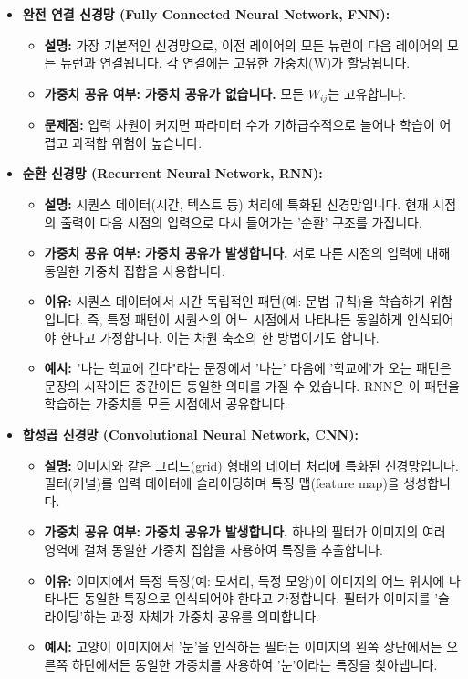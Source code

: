 \documentclass[11pt,a4paper]{article}
\begin{document}
\begin{itemize}
    \item \textbf{완전 연결 신경망 (Fully Connected Neural Network, FNN):}
    \begin{itemize}
        \item \textbf{설명:} 가장 기본적인 신경망으로, 이전 레이어의 모든 뉴런이 다음 레이어의 모든 뉴런과 연결됩니다. 각 연결에는 고유한 가중치(W)가 할당됩니다.
        \item \textbf{가중치 공유 여부:} \textbf{가중치 공유가 없습니다.} 모든 $W_{ij}$는 고유합니다.
        \item \textbf{문제점:} 입력 차원이 커지면 파라미터 수가 기하급수적으로 늘어나 학습이 어렵고 과적합 위험이 높습니다.
    \end{itemize}

    \item \textbf{순환 신경망 (Recurrent Neural Network, RNN):}
    \begin{itemize}
        \item \textbf{설명:} 시퀀스 데이터(시간, 텍스트 등) 처리에 특화된 신경망입니다. 현재 시점의 출력이 다음 시점의 입력으로 다시 들어가는 '순환' 구조를 가집니다.
        \item \textbf{가중치 공유 여부:} \textbf{가중치 공유가 발생합니다.} 서로 다른 시점의 입력에 대해 동일한 가중치 집합을 사용합니다.
        \item \textbf{이유:} 시퀀스 데이터에서 시간 독립적인 패턴(예: 문법 규칙)을 학습하기 위함입니다. 즉, 특정 패턴이 시퀀스의 어느 시점에서 나타나든 동일하게 인식되어야 한다고 가정합니다. 이는 차원 축소의 한 방법이기도 합니다.
        \item \textbf{예시:} "나는 학교에 간다"라는 문장에서 '나는' 다음에 '학교에'가 오는 패턴은 문장의 시작이든 중간이든 동일한 의미를 가질 수 있습니다. RNN은 이 패턴을 학습하는 가중치를 모든 시점에서 공유합니다.
    \end{itemize}

    \item \textbf{합성곱 신경망 (Convolutional Neural Network, CNN):}
    \begin{itemize}
        \item \textbf{설명:} 이미지와 같은 그리드(grid) 형태의 데이터 처리에 특화된 신경망입니다. 필터(커널)를 입력 데이터에 슬라이딩하며 특징 맵(feature map)을 생성합니다.
        \item \textbf{가중치 공유 여부:} \textbf{가중치 공유가 발생합니다.} 하나의 필터가 이미지의 여러 영역에 걸쳐 동일한 가중치 집합을 사용하여 특징을 추출합니다.
        \item \textbf{이유:} 이미지에서 특정 특징(예: 모서리, 특정 모양)이 이미지의 어느 위치에 나타나든 동일한 특징으로 인식되어야 한다고 가정합니다. 필터가 이미지를 '슬라이딩'하는 과정 자체가 가중치 공유를 의미합니다.
        \item \textbf{예시:} 고양이 이미지에서 '눈'을 인식하는 필터는 이미지의 왼쪽 상단에서든 오른쪽 하단에서든 동일한 가중치를 사용하여 '눈'이라는 특징을 찾아냅니다.
    \end{itemize}
\end{itemize}
\end{document}
